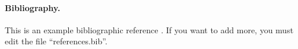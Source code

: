 \documentclass{article}
\begin{document}
\paragraph*{Bibliography.}
This is an example bibliographic reference \cite{anderson2008end}. If you want to add more, you must edit the file ``references.bib''.




\end{document}
